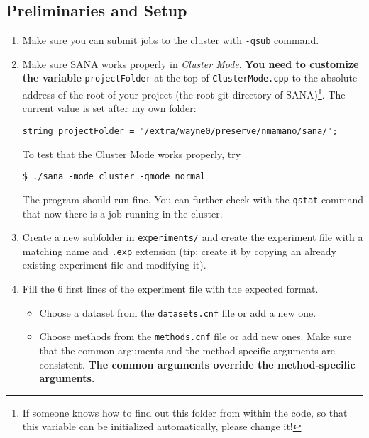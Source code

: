 \documentclass[]{article}
\begin{document}
\subsection{Preliminaries and Setup}
\begin{enumerate}
\item Make sure you can submit jobs to the cluster with \verb|-qsub| command.
\item Make sure SANA works properly in \textit{Cluster Mode}. \textbf{You need to customize the variable} \verb|projectFolder| at the top of \verb|ClusterMode.cpp| to the absolute address of the root of your project (the root git directory of SANA)\footnote{If someone knows how to find out this folder from within the code, so that this variable can be initialized automatically, please change it!}. The current value is set after my own folder:
\begin{verbatim}
string projectFolder = "/extra/wayne0/preserve/nmamano/sana/";
\end{verbatim}
To test that the Cluster Mode works properly, try
\begin{verbatim}
$ ./sana -mode cluster -qmode normal
\end{verbatim}
The program should run fine. You can further check with the \verb|qstat| command that now there is a job running in the cluster.
\item Create a new subfolder in \verb|experiments/| and create the experiment file with a matching name and \verb|.exp| extension (tip: create it by copying an already existing experiment file and modifying it).
\item Fill the 6 first lines of the experiment file with the expected format.
\begin{itemize}
\item Choose a dataset from the \verb|datasets.cnf| file or add a new one.
\item Choose methods from the \verb|methods.cnf| file or add new ones. Make sure that the common arguments and the method-specific arguments are consistent. \textbf{The common arguments override the method-specific arguments.}
\end{itemize}
\end{enumerate}
\end{document}
